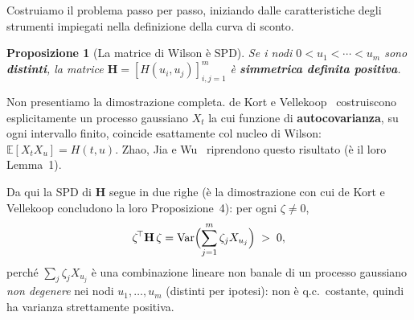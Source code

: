 \documentclass[11pt,a4paper]{article}
\theoremstyle{plain}
\newtheorem{proposizione}[teorema]{Proposizione}
\theoremstyle{definition}
\theoremstyle{remark}
\newcommand{\Hmat}{\mathbf{H}}
\newcommand{\transp}{^{\!\top}}
\begin{document}
Costruiamo il problema passo per passo, iniziando dalle caratteristiche degli strumenti impiegati nella definizione della curva di sconto.

\begin{proposizione}[La matrice di Wilson \`e SPD]
\label{prop:H-spd}
Se i nodi $0<u_1<\cdots<u_m$ sono \textbf{distinti}, la matrice
$\Hmat=[H(u_i,u_j)]_{i,j=1}^m$ \`e \textbf{simmetrica definita positiva}.
\end{proposizione}

Non presentiamo la dimostrazione completa. de Kort e Vellekoop~\cite{dekort2016}
costruiscono esplicitamente un processo gaussiano $X_t$ la cui funzione di
\textbf{autocovarianza}, su ogni intervallo finito, coincide esattamente col nucleo di
Wilson: $\mathbb{E}[X_tX_u] = H(t,u)$. Zhao, Jia e Wu~\cite{zhao2024} riprendono questo
risultato (\`e il loro Lemma~1).


Da qui la SPD di $\Hmat$ segue in due righe (\`e la dimostrazione con cui de Kort e
Vellekoop concludono la loro Proposizione~4): per ogni $\zeta\neq 0$,
\[
  \zeta\transp\Hmat\,\zeta = \operatorname{Var}\Bigl(\sum_{j=1}^m \zeta_j X_{u_j}\Bigr) \;>\; 0,
\]
perch\'e $\sum_j\zeta_jX_{u_j}$ \`e una combinazione lineare non banale di un processo
gaussiano \emph{non degenere} nei nodi $u_1,\ldots,u_m$ (distinti per ipotesi): non \`e
q.c.\ costante, quindi ha varianza strettamente positiva.

\end{document}
